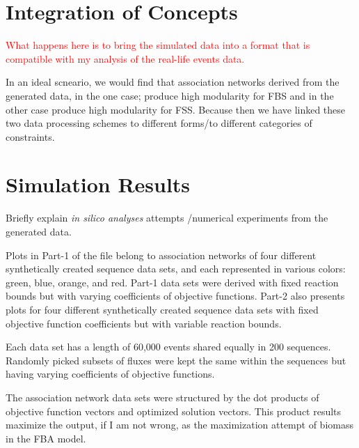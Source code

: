 \section{Integration of Concepts}
\textcolor{red}{What happens here is to bring the simulated data into a format that is compatible with my analysis of the real-life events data.}


{\color{red} 
	In an ideal scneario, we would find that association networks derived from the generated data, in the one case; produce high modularity for FBS and in the other case produce high modularity for FSS. Because then we have linked these two data processing schemes to different forms/to different categories of constraints.
}

\section{Simulation Results}
{\color{red} 
	
	Briefly explain \emph{in silico analyses} attempts /numerical experiments from the generated data.
	
	Plots in Part-1 of the file belong to association networks of four different synthetically created sequence data sets, and each represented in various colors: green, blue, orange, and red. Part-1 data sets were derived with fixed reaction bounds but with varying coefficients of objective functions. Part-2 also presents plots for four different synthetically created sequence data sets with fixed objective function coefficients but with variable reaction bounds.
	
	Each data set has a length of 60,000 events shared equally in 200 sequences. Randomly picked subsets of fluxes were kept the same within the sequences but having varying coefficients of objective functions.
	
	The association network data sets were structured by the dot products of objective function vectors and optimized solution vectors. This product results maximize the output, if I am not wrong, as the maximization attempt of biomass in the FBA model.
	
	
}






